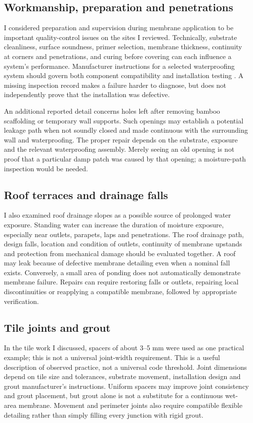\subsection{Workmanship, preparation and penetrations}
I considered preparation and supervision during membrane application to be important quality-control issues on the sites I reviewed. Technically, substrate cleanliness, surface soundness, primer selection, membrane thickness, continuity at corners and penetrations, and curing before covering can each influence a system's performance. Manufacturer instructions for a selected waterproofing system should govern both component compatibility and installation testing \parencite{laticrete2026}. A missing inspection record makes a failure harder to diagnose, but does not independently prove that the installation was defective.

An additional reported detail concerns holes left after removing bamboo scaffolding or temporary wall supports. Such openings may establish a potential leakage path when not soundly closed and made continuous with the surrounding wall and waterproofing. The proper repair depends on the substrate, exposure and the relevant waterproofing assembly. Merely seeing an old opening is not proof that a particular damp patch was caused by that opening; a moisture-path inspection would be needed.

\subsection{Roof terraces and drainage falls}
I also examined roof drainage slopes as a possible source of prolonged water exposure. Standing water can increase the duration of moisture exposure, especially near outlets, parapets, laps and penetrations. The roof drainage path, design falls, location and condition of outlets, continuity of membrane upstands and protection from mechanical damage should be evaluated together. A roof may leak because of defective membrane detailing even when a nominal fall exists. Conversely, a small area of ponding does not automatically demonstrate membrane failure. Repairs can require restoring falls or outlets, repairing local discontinuities or reapplying a compatible membrane, followed by appropriate verification.

\subsection{Tile joints and grout}
In the tile work I discussed, spacers of about 3--5 mm were used as one practical example; this is not a universal joint-width requirement. This is a useful description of observed practice, not a universal code threshold. Joint dimensions depend on tile size and tolerances, substrate movement, installation design and grout manufacturer's instructions. Uniform spacers may improve joint consistency and grout placement, but grout alone is not a substitute for a continuous wet-area membrane. Movement and perimeter joints also require compatible flexible detailing rather than simply filling every junction with rigid grout.


